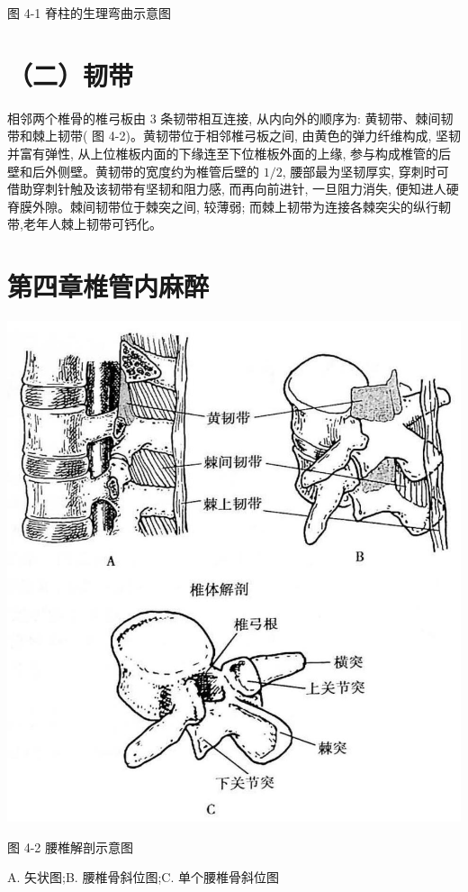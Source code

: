 \documentclass[10pt]{article}
\begin{document}
图 4-1 脊柱的生理弯曲示意图

\section*{（二）韧带}
相邻两个椎骨的椎弓板由 3 条韧带相互连接, 从内向外的顺序为: 黄韧带、棘间韧带和棘上韧带( 图 4-2)。黄韧带位于相邻椎弓板之间, 由黄色的弹力纤维构成, 坚韧并富有弹性, 从上位椎板内面的下缘连至下位椎板外面的上缘, 参与构成椎管的后壁和后外侧壁。黄韧带的宽度约为椎管后壁的 $1 / 2$, 腰部最为坚韧厚实, 穿刺时可借助穿刺针触及该韧带有坚韧和阻力感, 而再向前进针, 一旦阻力消失, 便知进人硬脊膜外隙。棘间韧带位于棘突之间, 较薄弱; 而棘上韧带为连接各棘突尖的纵行軔带,老年人棘上韧带可钙化。

\section*{第四章椎管内麻醉}
\begin{center}
\includegraphics[max width=\textwidth]{2024_07_09_002a177993bd97d1d6d7g-059}
\end{center}

图 4-2 腰椎解剖示意图

A. 矢状图;B. 腰椎骨斜位图;C. 单个腰椎骨斜位图
\end{document}
